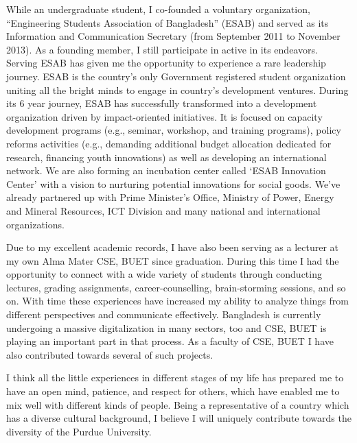 \documentclass[11.5pt]{article}
\begin{document}
While an undergraduate student, I co-founded a voluntary organization, ``Engineering Students Association of Bangladesh'' (ESAB) and served as its Information and Communication Secretary (from September 2011 to November 2013). As a founding member, I still participate in active in its endeavors. Serving ESAB has given me the opportunity to experience a rare leadership journey. ESAB is the country's only Government registered student organization uniting all the bright minds to engage in country's development ventures. During its 6 year journey, ESAB has successfully transformed into a development organization driven by impact-oriented initiatives. It is focused on capacity development programs (e.g., seminar, workshop, and training programs), policy reforms activities (e.g., demanding additional budget allocation dedicated for research, financing youth innovations) as well as developing an international network. We are also forming an incubation center called `ESAB Innovation Center' with a vision to nurturing potential innovations for social goods. We've already partnered up with Prime Minister's Office, Ministry of Power, Energy and Mineral Resources, ICT Division and many national and international organizations. 

Due to my excellent academic records, I have also been serving as a lecturer at my own Alma Mater CSE, BUET since graduation. During this time I had the opportunity to connect with a wide variety of students through conducting lectures, grading assignments, career-counselling, brain-storming sessions, and so on. With time these experiences have increased my ability to analyze things from different perspectives and communicate effectively.  Bangladesh is currently undergoing a massive digitalization in many sectors, too and CSE, BUET is playing an important part in that process. As a faculty of CSE, BUET I have also contributed towards several of such projects. 

I think all the little experiences in different stages of my life has prepared me to have an open mind, patience, and respect for others, which have enabled me to mix well with different kinds of people. Being a representative of a country which has a diverse cultural background, I believe I will uniquely contribute towards the diversity of the Purdue University.


\end{document}
